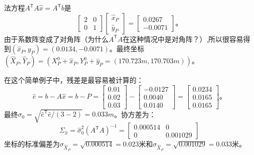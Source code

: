 法方程$A^\mathsf{T}A\hat{x} = A^\mathsf{T}b$是
\begin{equation*}
	\begin{bmatrix}
		2  & 0 \\
		0 & 1
	\end{bmatrix}
	\begin{bmatrix}
		\hat{x}_P \\ \hat{y}_P
	\end{bmatrix}
	=
	\begin{bmatrix}
		0.0267\\
		-0.0071
	\end{bmatrix} \text{。}
\end{equation*}
由于系数阵变成了对角阵（为什么$A^\mathsf{T}A$在这种情况中是对角阵？）,所以很容易得到$(\hat{x}_P,\hat{y}_P) = (0.013 4,-0.007 1)$。最终坐标$(\hat{X}_P,\hat{Y}_P) = (X_{P}^{0} +
\hat{x}_P,Y_{P}^{0} + \hat{y}_P =  (170.723 m, 170.703 m))$。
\par
在这个简单例子中，残差是最容易被计算的：
\begin{equation*}
	\hat{e} = b - A\hat{x}
	= b - P
	=
	\begin{bmatrix}
		0.01 \\ 0.02 \\ 0.03
	\end{bmatrix}
	-
	\begin{bmatrix}
		-0.0127 \\ 0.0040 \\ 0.0140
	\end{bmatrix}
	=
	\begin{bmatrix}
		0.0234 \\ 0.0165 \\ 0.0165
	\end{bmatrix} \text{。}
\end{equation*}
最终${\hat{\sigma}}_0 = \sqrt{\hat{e}^\mathsf{T}\hat{e}/(3 - 2)} = 0.033m$。协方差为：
\begin{equation*}
	\Sigma_{\hat{x}}
	= {\hat{\sigma}}_{0}^{2}(A^\mathsf{T}A)^{-1}
	=
	\begin{bmatrix}
		0.000514 & 0\\
		0 & 0.001029
	\end{bmatrix}
\end{equation*}
坐标的标准偏差为$\sigma_{\hat{X}_P} = \sqrt{0.000514} = 0.023$米和$\sigma_{\hat{X}_P} = \sqrt{0.001 029} = 0.033$米。
\par\noindent
